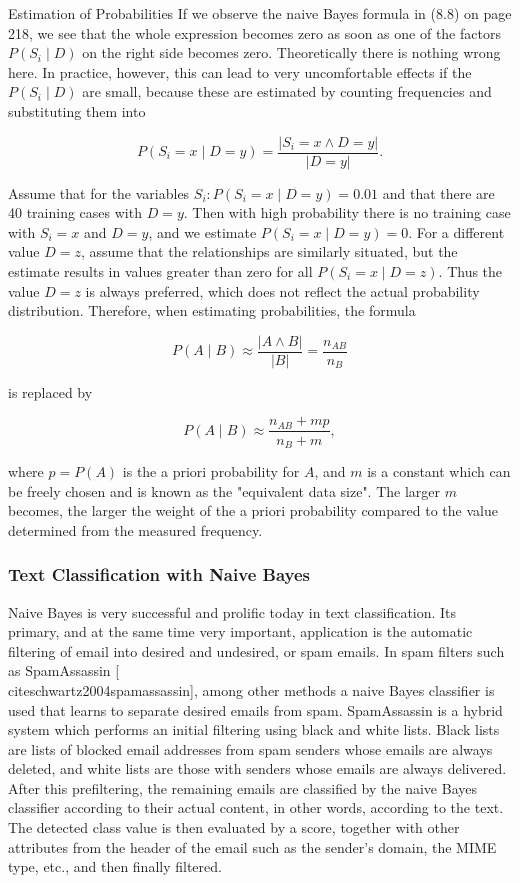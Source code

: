 \documentclass[10pt]{book}
\begin{document}
Estimation of Probabilities If we observe the naive Bayes formula in (8.8) on page 218, we see that the whole expression becomes zero as soon as one of the factors $P\left(S_{i} \mid D\right)$ on the right side becomes zero. Theoretically there is nothing wrong here. In practice, however, this can lead to very uncomfortable effects if the $P\left(S_{i} \mid D\right)$ are small, because these are estimated by counting frequencies and substituting them into

$$
P\left(S_{i}=x \mid D=y\right)=\frac{\left|S_{i}=x \wedge D=y\right|}{|D=y|} .
$$

Assume that for the variables $S_{i}: P\left(S_{i}=x \mid D=y\right)=0.01$ and that there are 40 training cases with $D=y$. Then with high probability there is no training case with $S_{i}=x$ and $D=y$, and we estimate $P\left(S_{i}=x \mid D=y\right)=0$. For a different value $D= z$, assume that the relationships are similarly situated, but the estimate results in values greater than zero for all $P\left(S_{i}=x \mid D=z\right)$. Thus the value $D=z$ is always preferred, which does not reflect the actual probability distribution. Therefore, when estimating probabilities, the formula

$$
P(A \mid B) \approx \frac{|A \wedge B|}{|B|}=\frac{n_{A B}}{n_{B}}
$$

is replaced by

$$
P(A \mid B) \approx \frac{n_{A B}+m p}{n_{B}+m},
$$

where $p=P(A)$ is the a priori probability for $A$, and $m$ is a constant which can be freely chosen and is known as the "equivalent data size". The larger $m$ becomes, the larger the weight of the a priori probability compared to the value determined from the measured frequency.

\subsubsection*{Text Classification with Naive Bayes}
Naive Bayes is very successful and prolific today in text classification. Its primary, and at the same time very important, application is the automatic filtering of email into desired and undesired, or spam emails. In spam filters such as SpamAssassin [\\cite{schwartz2004spamassassin}], among other methods a naive Bayes classifier is used that learns to separate desired emails from spam. SpamAssassin is a hybrid system which performs an initial filtering using black and white lists. Black lists are lists of blocked email addresses from spam senders whose emails are always deleted, and white lists are those with senders whose emails are always delivered. After this prefiltering, the remaining emails are classified by the naive Bayes classifier according to their actual content, in other words, according to the text. The detected class value is then evaluated by a score, together with other attributes from the header of the email such as the sender's domain, the MIME type, etc., and then finally filtered.
\end{document}
